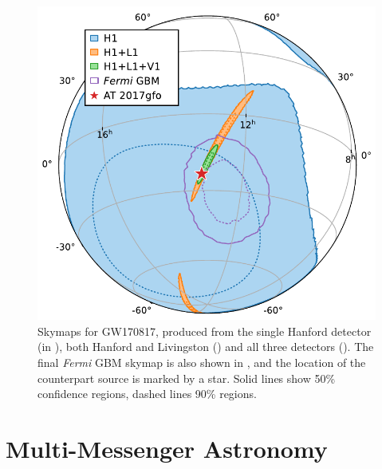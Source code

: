 \begin{colsection}
\begin{figure}[p]
    \begin{center}
        \includegraphics[width=\linewidth]{images/skymaps.pdf}
    \end{center}
    \caption[Skymaps for GW170817]{
        Skymaps for GW170817, produced from the single Hanford detector (in ), both Hanford and Livingston () and all three detectors (). The final \textit{Fermi} GBM skymap is also shown in , and the location of the counterpart source is marked by a  star. Solid lines show 50\% confidence regions, dashed lines 90\% regions.
        }\label{fig:170817_skymaps}
\end{figure}

\newpage

\end{colsection}


\section{Multi-Messenger Astronomy}
\label{sec:multi}


